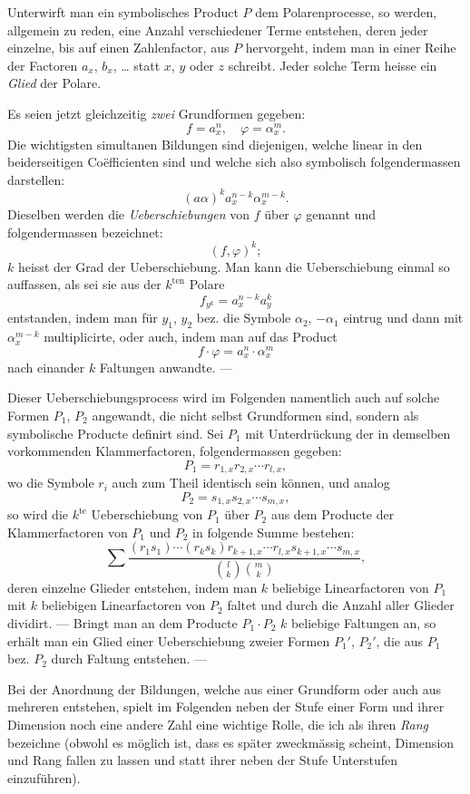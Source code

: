 \documentclass[10pt]{article}
\begin{document}
Unterwirft man ein symbolisches Product $P$ dem Polarenprocesse, so werden, allgemein zu reden, eine Anzahl verschiedener Terme entstehen, deren jeder einzelne, bis auf einen Zahlenfactor, aus $P$ hervorgeht, indem man in einer Reihe der Factoren $a_x$, $b_x$, \ldots{} statt $x$, $y$ oder $z$ schreibt. Jeder solche Term heisse ein \emph{Glied} der Polare.

Es seien jetzt gleichzeitig \emph{zwei} Grundformen gegeben:
\[
f=a_x^n,\quad \varphi=\alpha_x^m.
\]
Die wichtigsten simultanen Bildungen sind diejenigen, welche linear in den beiderseitigen Coëfficienten sind und welche sich also symbolisch folgendermassen darstellen:
\[
(a\alpha)^k a_x^{n-k}\alpha_x^{m-k}.
\]
Dieselben werden die \emph{Ueberschiebungen} von $f$ über $\varphi$ genannt und folgendermassen bezeichnet:
\[
(f,\varphi)^k;
\]
$k$ heisst der Grad der Ueberschiebung. Man kann die Ueberschiebung einmal so auffassen, als sei sie aus der $k^{\mathrm{ten}}$ Polare
\[
f_{y^k}=a_x^{n-k}a_y^k
\]
entstanden, indem man für $y_1$, $y_2$ bez. die Symbole $\alpha_2$, $-\alpha_1$ eintrug und dann mit $\alpha_x^{m-k}$ multiplicirte, oder auch, indem man auf das Product
\[
f\cdot\varphi=a_x^n\cdot \alpha_x^m
\]
nach einander $k$ Faltungen anwandte. ---

Dieser Ueberschiebungsprocess wird im Folgenden namentlich auch auf solche Formen $P_1$, $P_2$ angewandt, die nicht selbst Grundformen sind, sondern als symbolische Producte definirt sind. Sei $P_1$ mit Unterdrückung der in demselben vorkommenden Klammerfactoren, folgendermassen gegeben:
\[
P_1=r_{1,x}r_{2,x}\cdots r_{l,x},
\]
wo die Symbole $r_i$ auch zum Theil identisch sein können, und analog
\[
P_2=s_{1,x}s_{2,x}\cdots s_{m,x},
\]
so wird die $k^{\mathrm{te}}$ Ueberschiebung von $P_1$ über $P_2$ aus dem Producte der Klammerfactoren von $P_1$ und $P_2$ in folgende Summe bestehen:
\[
\sum \frac{(r_1s_1)\cdots(r_ks_k)r_{k+1,x}\cdots r_{l,x}s_{k+1,x}\cdots s_{m,x}}{\binom{l}{k}\binom{m}{k}},
\]
deren einzelne Glieder entstehen, indem man $k$ beliebige Linearfactoren von $P_1$ mit $k$ beliebigen Linearfactoren von $P_2$ faltet und durch die Anzahl aller Glieder dividirt. --- Bringt man an dem Producte $P_1\cdot P_2$ $k$ beliebige Faltungen an, so erhält man ein Glied einer Ueberschiebung zweier Formen $P_1'$, $P_2'$, die aus $P_1$ bez. $P_2$ durch Faltung entstehen. ---

Bei der Anordnung der Bildungen, welche aus einer Grundform oder auch aus mehreren entstehen, spielt im Folgenden neben der Stufe einer Form und ihrer Dimension noch eine andere Zahl eine wichtige Rolle, die ich als ihren \emph{Rang} bezeichne (obwohl es möglich ist, dass es später zweckmässig scheint, Dimension und Rang fallen zu lassen und statt ihrer neben der Stufe Unterstufen einzuführen).
\end{document}
